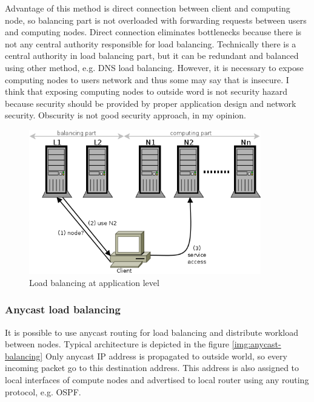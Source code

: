 Advantage of this method is direct connection between client and computing node, so balancing part is not overloaded with forwarding requests between users and computing nodes. Direct connection eliminates bottlenecks because there is not any central authority responsible for load balancing. Technically there is a central authority in load balancing part, but it can be redundant and balanced using other method, e.g. \Ac{DNS} load balancing.  However, it is necessary to expose computing nodes to users network and thus some may say that is insecure. I think that exposing computing nodes to outside word is not security hazard because security should be provided by proper application design and network security. Obscurity is not good security approach, in my opinion.

\begin{figure}[htb]
	\begin{center}
	\includegraphics[width=0.9\textwidth]{balancing-application.png}
	\end{center}
	\caption{Load balancing at application level}
	\label{img:balancing-application}
\end{figure}

\subsubsection{Anycast load balancing}
It is possible to use anycast routing for load balancing and distribute workload between nodes. Typical architecture is depicted in the figure \ref{img:anycast-balancing} Only anycast \Ac{IP} address is propagated to outside world, so every incoming packet go to this destination address. This address is also assigned to local interfaces of compute nodes and advertised to local router using any routing protocol, e.g. \Ac{OSPF}. 

